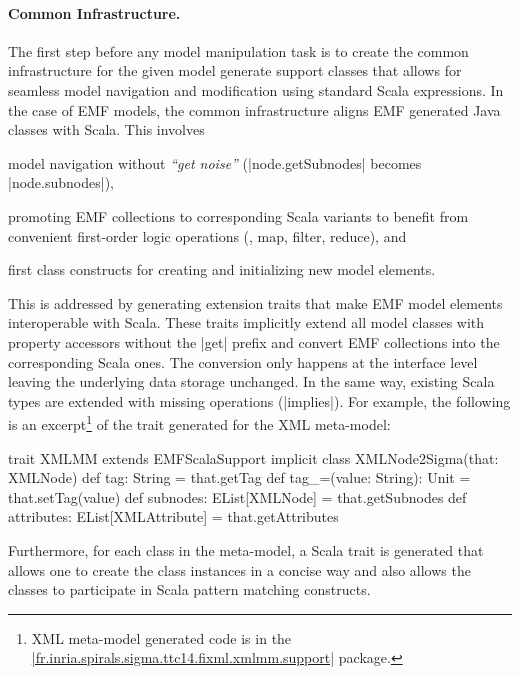\paragraph{Common Infrastructure.} 
%
The first step before any \SIGMA model manipulation task is to create the common infrastructure for the given model \Ie generate support classes that allows for seamless model navigation and modification using standard Scala expressions.
In the case of EMF models, the common infrastructure aligns EMF generated Java classes with Scala.
This involves
%
\begin{inparaitem}[]
  \item model navigation without \emph{``get noise''} (\Eg \Scala|node.getSubnodes| becomes \Scala|node.subnodes|),
  \item promoting EMF collections to corresponding Scala variants to benefit from convenient first-order logic operations (\Eg, map, filter, reduce), and
  \item first class constructs for creating and initializing new model elements.
\end{inparaitem}

This is addressed by generating extension traits that make EMF model elements interoperable with Scala.
These traits implicitly extend all model classes with property accessors without the \Scala|get| prefix and convert EMF collections into the corresponding Scala ones.
The conversion only happens at the interface level leaving the underlying data storage unchanged.
In the same way, existing Scala types are extended with missing operations (\Eg \Scala|implies|).
For example, the following is an excerpt\footnote{XML meta-model generated code is in the \href{https://github.com/fikovnik/ttc14-fixml-sigma/tree/master/ttc14-fixml-base/src-gen/fr/inria/spirals/sigma/ttc14/fixml/xmlmm/support}{\Scala|fr.inria.spirals.sigma.ttc14.fixml.xmlmm.support|} package.} of the trait generated for the XML meta-model: 
%
\begin{scalacode}
trait XMLMM extends EMFScalaSupport { 
  implicit class XMLNode2Sigma(that: XMLNode) {
    def tag: String = that.getTag
    def tag_=(value: String): Unit = that.setTag(value)
    def subnodes: EList[XMLNode] = that.getSubnodes
    def attributes: EList[XMLAttribute] = that.getAttributes
  }
}
\end{scalacode}
%
Furthermore, for each class in the meta-model, a Scala trait is generated that allows one to create the class instances in a concise way and also allows the classes to participate in Scala pattern matching constructs.

